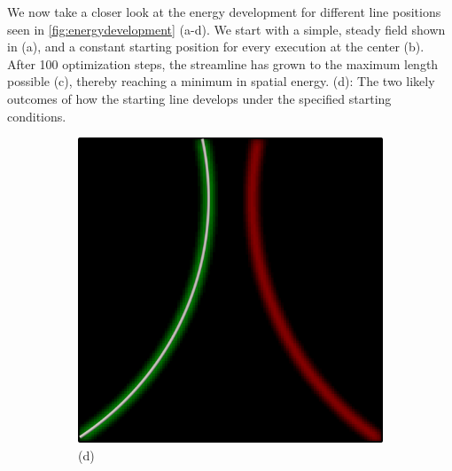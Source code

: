 \noindent We now take a closer look at the energy development for different line positions seen in \cref{fig:energydevelopment} (a-d).
\noindent We start with a simple, steady field shown in (a), and a constant starting position for every execution at the center (b).
After 100 optimization steps, the streamline has grown to the maximum length possible (c), thereby reaching a minimum in spatial energy.
(d): The two likely outcomes of how the starting line develops under the specified starting conditions.
\begin{figure}[ht]
    \centering
    \begin{subfigure}{.22\textwidth}
        \centering
        \includegraphics[scale=.06]{figures/Coaxing/SingleLine2.png}
        \caption*{(d)}
    \end{subfigure}
    \begin{subfigure}{.22\textwidth}
        \centering

\end{subfigure}
\end{figure}
